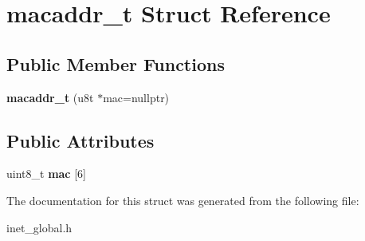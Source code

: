 \hypertarget{structmacaddr__t}{}\section{macaddr\+\_\+t Struct Reference}
\label{structmacaddr__t}
\subsection*{Public Member Functions}
\begin{DoxyCompactItemize}
\item 
\mbox{\label{structmacaddr__t_a442a83a92a78c0a1acacbe36e0471728}} 
{\bfseries macaddr\+\_\+t} (u8t $\ast$mac=nullptr)
\end{DoxyCompactItemize}
\subsection*{Public Attributes}
\begin{DoxyCompactItemize}
\item 
\mbox{\label{structmacaddr__t_a3c7dd2e488f6e23119c500482ac3c64a}} 
uint8\+\_\+t {\bfseries mac} \mbox{[}6\mbox{]}
\end{DoxyCompactItemize}


The documentation for this struct was generated from the following file\+:\begin{DoxyCompactItemize}
\item 
inet\+\_\+global.\+h\end{DoxyCompactItemize}
